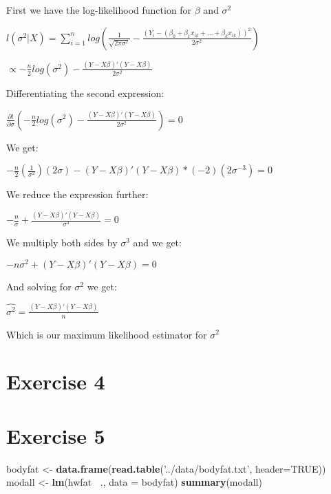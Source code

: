 \documentclass[]{article}
\newenvironment{Shaded}{\begin{snugshade}}{\end{snugshade}}
\newcommand{\DataTypeTok}[1]{\textcolor[rgb]{0.13,0.29,0.53}{#1}}
\newcommand{\KeywordTok}[1]{\textcolor[rgb]{0.13,0.29,0.53}{\textbf{#1}}}
\newcommand{\NormalTok}[1]{#1}
\newcommand{\OperatorTok}[1]{\textcolor[rgb]{0.81,0.36,0.00}{\textbf{#1}}}
\newcommand{\OtherTok}[1]{\textcolor[rgb]{0.56,0.35,0.01}{#1}}
\newcommand{\StringTok}[1]{\textcolor[rgb]{0.31,0.60,0.02}{#1}}
\begin{document}
First we have the log-likelihood function for \(\beta\) and
\(\sigma^{2}\)

\(l(\sigma^{2} | X) = \sum_{i=1}^n log(\frac{1}{\sqrt{2 \pi \sigma^{2}}} - \frac{(Y_{i} - (\beta_{0} + \beta_{1} x_{ik} + \dots + \beta_{k} x_{ik}))^{2}}{2 \sigma^{2}})\)

\(\propto - \frac{n}{2} log(\sigma^{2}) - \frac{(Y - X \beta) \prime (Y - X \beta)}{2 \sigma^{2}}\)

Differentiating the second expression:

\(\frac{\partial l}{\partial \sigma} ( - \frac{n}{2} log(\sigma^{2}) - \frac{(Y - X \beta) \prime (Y - X \beta)}{2 \sigma^{2}}) = 0\)

We get:

\(- \frac{n}{2} (\frac{1}{ \sigma^{2}} ) (2 \sigma) - (Y - X \beta) \prime (Y - X \beta) * (-2)(2 \sigma^{-3}) = 0\)

We reduce the expression further:

\(- \frac{n}{\sigma} + \frac{(Y - X \beta) \prime (Y - X \beta)}{\sigma^{3}} = 0\)

We multiply both sides by \(\sigma^{3}\) and we get:

\(- n \sigma^{2} + (Y - X \beta) \prime (Y - X \beta) = 0\)

And solving for \(\sigma^{2}\) we get:

\(\hat{\sigma^{2}} = \frac{(Y - X \beta) \prime (Y - X \beta)}{n}\)

Which is our maximum likelihood estimator for \(\sigma^2\)

\hypertarget{exercise-4}{%
\section{Exercise 4}\label{exercise-4}}

\newpage

\hypertarget{exercise-5}{%
\section{Exercise 5}\label{exercise-5}}

\begin{Shaded}
\begin{Highlighting}[]
\NormalTok{bodyfat <-}\StringTok{ }\KeywordTok{data.frame}\NormalTok{(}\KeywordTok{read.table}\NormalTok{(}\StringTok{'../data/bodyfat.txt'}\NormalTok{, }\DataTypeTok{header=}\OtherTok{TRUE}\NormalTok{))}
\NormalTok{modall <-}\StringTok{ }\KeywordTok{lm}\NormalTok{(hwfat }\OperatorTok{~}\NormalTok{., }\DataTypeTok{data =}\NormalTok{ bodyfat)}
\KeywordTok{summary}\NormalTok{(modall)}
\end{Highlighting}
\end{Shaded}
\end{document}

